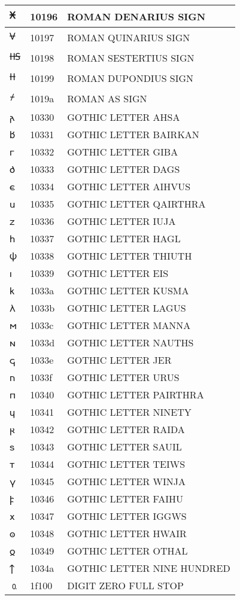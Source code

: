 \documentclass[12pt,letterpaper,openany]{book}
\begin{document}
\begin{center}
\begin{supertabular}{|m{0.25in}|m{0.5in}|m{4in}|}
𐆖 & 10196 & ROMAN DENARIUS SIGN\\\hline
𐆗 & 10197 & ROMAN QUINARIUS SIGN\\\hline
𐆘 & 10198 & ROMAN SESTERTIUS SIGN\\\hline
𐆙 & 10199 & ROMAN DUPONDIUS SIGN\\\hline
𐆚 & 1019a & ROMAN AS SIGN\\\hline
𐌰 & 10330 & GOTHIC LETTER AHSA\\\hline
𐌱 & 10331 & GOTHIC LETTER BAIRKAN\\\hline
𐌲 & 10332 & GOTHIC LETTER GIBA\\\hline
𐌳 & 10333 & GOTHIC LETTER DAGS\\\hline
𐌴 & 10334 & GOTHIC LETTER AIHVUS\\\hline
𐌵 & 10335 & GOTHIC LETTER QAIRTHRA\\\hline
𐌶 & 10336 & GOTHIC LETTER IUJA\\\hline
𐌷 & 10337 & GOTHIC LETTER HAGL\\\hline
𐌸 & 10338 & GOTHIC LETTER THIUTH\\\hline
𐌹 & 10339 & GOTHIC LETTER EIS\\\hline
𐌺 & 1033a & GOTHIC LETTER KUSMA\\\hline
𐌻 & 1033b & GOTHIC LETTER LAGUS\\\hline
𐌼 & 1033c & GOTHIC LETTER MANNA\\\hline
𐌽 & 1033d & GOTHIC LETTER NAUTHS\\\hline
𐌾 & 1033e & GOTHIC LETTER JER\\\hline
𐌿 & 1033f & GOTHIC LETTER URUS\\\hline
𐍀 & 10340 & GOTHIC LETTER PAIRTHRA\\\hline
𐍁 & 10341 & GOTHIC LETTER NINETY\\\hline
𐍂 & 10342 & GOTHIC LETTER RAIDA\\\hline
𐍃 & 10343 & GOTHIC LETTER SAUIL\\\hline
𐍄 & 10344 & GOTHIC LETTER TEIWS\\\hline
𐍅 & 10345 & GOTHIC LETTER WINJA\\\hline
𐍆 & 10346 & GOTHIC LETTER FAIHU\\\hline
𐍇 & 10347 & GOTHIC LETTER IGGWS\\\hline
𐍈 & 10348 & GOTHIC LETTER HWAIR\\\hline
𐍉 & 10349 & GOTHIC LETTER OTHAL\\\hline
𐍊 & 1034a & GOTHIC LETTER NINE HUNDRED\\\hline
🄀 & 1f100 & DIGIT ZERO FULL STOP\\\hline

\end{supertabular}
\end{center}
\end{document}
